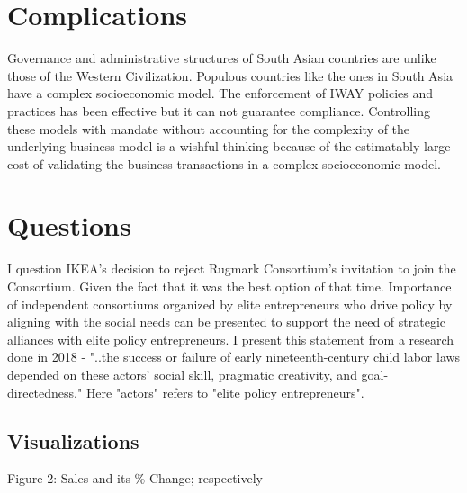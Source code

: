 \documentclass[a4paper, 11pt, margin=1in]{article}
\begin{document}
\section{Complications}
Governance and administrative structures of South Asian countries are unlike those of the Western Civilization. Populous countries like the ones in South Asia have a complex socioeconomic model. 
The enforcement of IWAY policies and practices has been effective but it can not guarantee compliance. Controlling these models with mandate without accounting for the complexity of the underlying business model is a wishful thinking because of the estimatably large cost of validating the business transactions in a complex socioeconomic model.

\section{Questions}
I question IKEA's decision to reject Rugmark Consortium's invitation to join the Consortium. Given the fact that it was the best option of that time. \cite{publichearing1998}
Importance of independent consortiums organized by elite entrepreneurs who drive policy by aligning with the social needs can be presented to support the need of strategic alliances with elite policy entrepreneurs. I present this statement from a research done in 2018 - "..the success or failure of early nineteenth-century child labor laws depended on these actors’ social skill, pragmatic creativity, and goal-directedness." \cite{anderson2018policy} Here "actors" refers to "elite policy entrepreneurs".




\subsection{Visualizations}

Figure 2: Sales and its \%-Change; respectively \\
\end{document}
